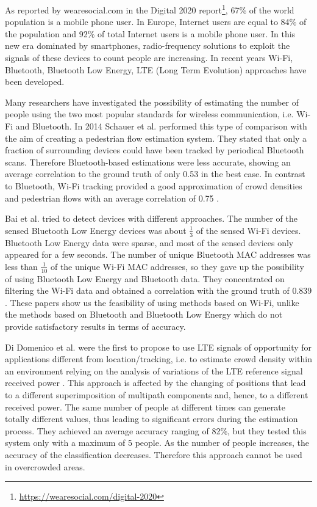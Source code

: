 As reported by wearesocial.com in the Digital 2020 report\footnote{\url{https://wearesocial.com/digital-2020}}, 67\% of the world population is a mobile phone user. In Europe, Internet users are equal to 84\% of the population and 92\% of total Internet users is a mobile phone user. In this new era dominated by smartphones, radio-frequency solutions to exploit the signals of these devices to count people are increasing. In recent years Wi-Fi, Bluetooth, Bluetooth Low Energy, LTE (Long Term Evolution) approaches have been developed.

Many researchers have investigated the possibility of estimating the number of people using the two most popular standards for wireless communication, i.e. Wi-Fi and Bluetooth. In 2014 Schauer et al. performed this type of comparison with the aim of creating a pedestrian flow estimation system. They stated that only a fraction of surrounding devices could have been tracked by periodical Bluetooth scans. Therefore Bluetooth-based estimations were less accurate, showing an average correlation to the ground truth of only 0.53 in the best case. In contrast to Bluetooth, Wi-Fi tracking provided a good approximation of crowd densities and pedestrian flows with an average correlation of 0.75 \cite{schauer2014estimating}.

Bai et al. tried to detect devices with different approaches. The number of the sensed Bluetooth Low Energy devices was about $\frac{1}{3}$ of the sensed Wi-Fi devices. Bluetooth Low Energy data were sparse, and most of the sensed devices only appeared for a few seconds. The number of unique Bluetooth MAC addresses was less than $\frac{1}{10}$ of the unique Wi-Fi MAC addresses, so they gave up the possibility of using Bluetooth Low Energy and Bluetooth data. They concentrated on filtering the Wi-Fi data and obtained a correlation with the ground truth of 0.839 \cite{bai2017lessons}.
These papers show us the feasibility of using methods based on Wi-Fi, unlike the methods based on Bluetooth and Bluetooth Low Energy which do not provide satisfactory results in terms of accuracy.

Di Domenico et al. were the first to propose to use LTE signals of opportunity for applications different from location/tracking, i.e. to estimate crowd density within an environment relying on the analysis of variations of the LTE reference signal received power \cite{di2017lte}. This approach is affected by the changing of positions that lead to a different superimposition of multipath components and, hence, to a different received power. The same number of people at different times can generate totally different values, thus leading to significant errors during the estimation process. They achieved an average accuracy ranging of 82\%, but they tested this system only with a maximum of 5 people. As the number of people increases, the accuracy of the classification decreases. Therefore this approach cannot be used in overcrowded areas.

